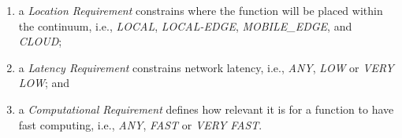 \begin{enumerate}

	\item a \textit{Location Requirement} constrains where the function will be placed within the continuum, i.e., \textit{LOCAL}, \textit{LOCAL-EDGE}, \textit{MOBILE\_EDGE}, and \textit{CLOUD}; 

	\item a \textit{Latency Requirement} constrains network latency, i.e., \textit{ANY}, \textit{LOW} or \textit{VERY LOW}; and 
	
	\item a \textit{Computational Requirement} defines how relevant it is for a function to have fast computing, i.e., \textit{ANY}, \textit{FAST} or \textit{VERY FAST}. 

\end{enumerate}




